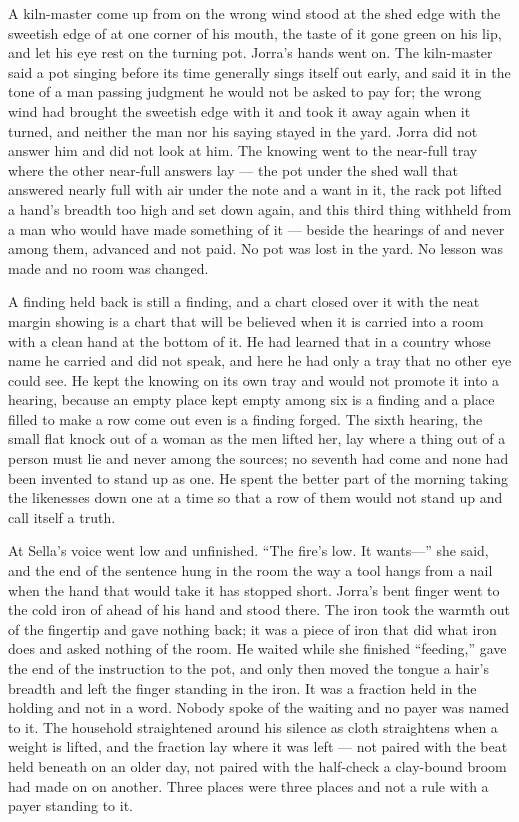A kiln-master come up from  on the wrong wind stood at the shed edge with the sweetish edge of  at one corner of his mouth, the taste of it gone green on his lip, and let his eye rest on the turning pot. Jorra's hands went on. The kiln-master said a pot singing before its time generally sings itself out early, and said it in the tone of a man passing judgment he would not be asked to pay for; the wrong wind had brought the sweetish edge with it and took it away again when it turned, and neither the man nor his saying stayed in the yard. Jorra did not answer him and did not look at him. The knowing went to the near-full tray where the other near-full answers lay --- the pot under the shed wall that answered nearly full with air under the note and a want in it, the rack pot lifted a hand's breadth too high and set down again, and this third thing withheld from a man who would have made something of it --- beside the hearings of  and never among them, advanced and not paid. No pot was lost in the yard. No lesson was made and no room was changed.

A finding held back is still a finding, and a chart closed over it with the neat margin showing is a chart that will be believed when it is carried into a room with a clean hand at the bottom of it. He had learned that in a country whose name he carried and did not speak, and here he had only a tray that no other eye could see. He kept the knowing on its own tray and would not promote it into a hearing, because an empty place kept empty among six is a finding and a place filled to make a row come out even is a finding forged. The sixth hearing, the small flat knock out of a woman as the men lifted her, lay where a thing out of a person must lie and never among the sources; no seventh had come and none had been invented to stand up as one. He spent the better part of the morning taking the likenesses down one at a time so that a row of them would not stand up and call itself a truth.

\scenebreak

At  Sella's voice went low and unfinished. “The fire's low. It wants---” she said, and the end of the sentence hung in the room the way a tool hangs from a nail when the hand that would take it has stopped short. Jorra's bent finger went to the cold iron of  ahead of his hand and stood there. The iron took the warmth out of the fingertip and gave nothing back; it was a piece of iron that did what iron does and asked nothing of the room. He waited while she finished “feeding,” gave the end of the instruction to the pot, and only then moved the tongue a hair's breadth and left the finger standing in the iron. It was a fraction held in the holding and not in a word. Nobody spoke of the waiting and no payer was named to it. The household straightened around his silence as cloth straightens when a weight is lifted, and the fraction lay where it was left --- not paired with the beat held beneath  on an older day, not paired with the half-check a clay-bound broom had made on  on another. Three places were three places and not a rule with a payer standing to it.

